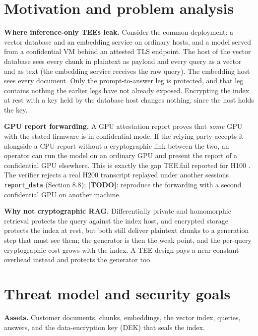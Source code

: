 \documentclass[letterpaper,twocolumn,10pt]{article}
\begin{document}
\section{Motivation and problem analysis}\label{motivation-and-problem-analysis}

\textbf{Where inference-only TEEs leak.} Consider the common deployment: a vector database and an embedding service on ordinary hosts, and a model served from a confidential VM behind an attested TLS endpoint. The host of the vector database sees every chunk in plaintext as payload and every query as a vector and as text (the embedding service receives the raw query). The embedding host sees every document. Only the prompt-to-answer leg is protected, and that leg contains nothing the earlier legs have not already exposed. Encrypting the index at rest with a key held by the database host changes nothing, since the host holds the key.

\textbf{GPU report forwarding.} A GPU attestation report proves that \emph{some} GPU with the stated firmware is in confidential mode. If the relying party accepts it alongside a CPU report without a cryptographic link between the two, an operator can run the model on an ordinary GPU and present the report of a confidential GPU elsewhere. This is exactly the gap TEE.fail reported for H100 \cite{chuang2025teefail}. The verifier rejects a real H200 transcript replayed under another session\textquotesingle s \texttt{report\_data} (Section 8.8); \textbf{{[}TODO{]}}: reproduce the forwarding with a second confidential GPU on another machine.

\textbf{Why not cryptographic RAG.} Differentially private and homomorphic retrieval \cite{cheng2025remoterag} protects the query against the index host, and encrypted storage \cite{zhou2025sag} protects the index at rest, but both still deliver plaintext chunks to a generation step that must see them; the generator is then the weak point, and the per-query cryptographic cost grows with the index. A TEE design pays a near-constant overhead instead and protects the generator too.

\section{Threat model and security goals}\label{threat-model-and-security-goals}

\textbf{Assets.} Customer documents, chunks, embeddings, the vector index, queries, answers, and the data-encryption key (DEK) that seals the index.
\end{document}
